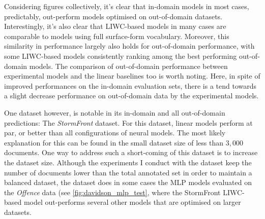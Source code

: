 Considering figures collectively, it's clear that in-domain models in most cases, predictably, out-perform models optimised on out-of-domain datasets.
Interestingly, it's also clear that LIWC-based models in many cases are comparable to models using full surface-form vocabulary.
Moreover, this similarity in performance largely also holds for out-of-domain performance, with some LIWC-based models consistently ranking among the best performing out-of-domain models.
The comparison of out-of-domain performance between experimental models and the linear baselines too is worth noting.
Here, in spite of improved performances on the in-domain evaluation sets, there is a tend towards a slight decrease performance on out-of-domain data by the experimental models.

One dataset however, is notable in its in-domain and all out-of-domain predictions: The \textit{StormFront} dataset.
For this dataset, linear models perform at par, or better than all configurations of neural models.
The most likely explanation for this can be found in the small dataset size of less than $3,000$ documents.
One way to address such a short-coming of this dataset is to increase the dataset size.
Although the experiments I conduct with the dataset keep the number of documents lower than the total annotated set in order to maintain a balanced dataset, the dataset does in some cases 
the MLP models evaluated on the \textit{Offence} data (see \cref{fig:davidson_mlp_test}, where the StormFront LIWC-based model out-performs several other models that are optimised on larger datasets.

